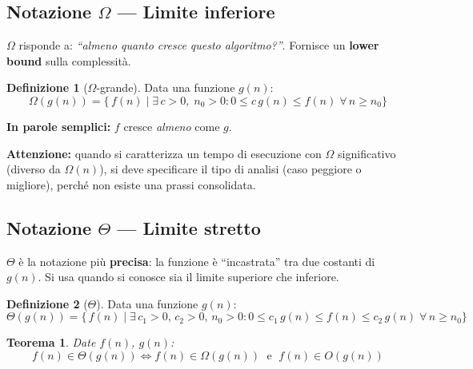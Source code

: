 \documentclass[a4paper, 11pt]{article}
\newtheorem{teorema}{Teorema}[section]
\theoremstyle{definition}
\newtheorem{definizione}{Definizione}[section]
\theoremstyle{remark}
\theoremstyle{remark}
\newenvironment{nota}{%
	\begin{tcolorbox}[
		colback=codebg,
		colframe=primary,
		fonttitle=\bfseries,
		title=Nota,
		left=6pt, right=6pt, top=4pt, bottom=4pt
		]
	}{%
	\end{tcolorbox}
}
\begin{document}
	\subsection{Notazione \texorpdfstring{$\Omega$}{Omega} — Limite inferiore}
	
	\begin{softnote}
		$\Omega$ risponde a: \textit{``almeno quanto cresce questo
			algoritmo?''}. Fornisce un \textbf{lower bound} sulla complessità.
	\end{softnote}
	
	\begin{definizione}[$\Omega$-grande]
		Data una funzione $g(n)$:
		\[
		\Omega(g(n)) = \bigl\{\,f(n) \mid \exists\,c>0,\;n_0>0 :
		0 \le c\,g(n) \le f(n) \;\forall\,n \ge n_0\bigr\}
		\]
	\end{definizione}
	
	\begin{nota}
		\textbf{In parole semplici:} $f$ cresce \textit{almeno} come $g$.
		
		\textbf{Attenzione:} quando si caratterizza un tempo di esecuzione
		con $\Omega$ significativo (diverso da $\Omega(n)$), si deve
		specificare il tipo di analisi (caso peggiore o migliore), perché
		non esiste una prassi consolidata.
	\end{nota}
	
	\subsection{Notazione \texorpdfstring{$\Theta$}{Theta} — Limite stretto}
	
	\begin{softnote}
		$\Theta$ è la notazione più \textbf{precisa}: la funzione è
		``incastrata'' tra due costanti di $g(n)$. Si usa quando si
		conosce sia il limite superiore che inferiore.
	\end{softnote}
	
	\begin{definizione}[$\Theta$]
		Data una funzione $g(n)$:
		\[
		\Theta(g(n)) = \bigl\{\,f(n) \mid \exists\,c_1>0,\,c_2>0,
		\,n_0>0 : 0 \le c_1\,g(n) \le f(n) \le c_2\,g(n)
		\;\forall\,n \ge n_0\bigr\}
		\]
	\end{definizione}
	
	\begin{teorema}
		Date $f(n)$, $g(n)$:
		\[
		f(n) \in \Theta(g(n)) \iff f(n) \in \Omega(g(n))
		\;\text{ e }\; f(n) \in O(g(n))
		\]
	\end{teorema}
	
\end{document}
